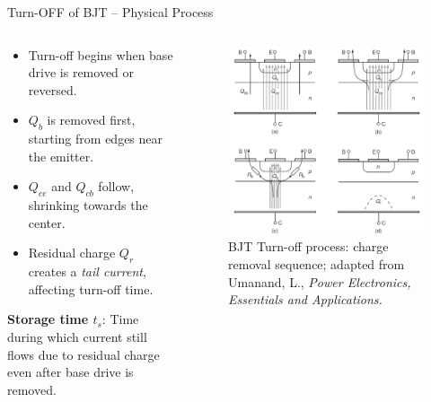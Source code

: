 \begin{frame}{Turn-OFF of BJT – Physical Process}
  \begin{columns}
    \begin{column}{0.5\textwidth}
\begin{itemize}
    \item Turn-off begins when base drive is removed or reversed.
    \item $Q_b$ is removed first, starting from edges near the emitter.
    \item $Q_{ce}$ and $Q_{cb}$ follow, shrinking towards the center.
    \item Residual charge $Q_r$ creates a \textit{tail current}, affecting turn-off time.
\end{itemize}
\textbf{Storage time $t_s$}: Time during which current still flows due to residual charge even after base drive is removed.
    \end{column}

    \begin{column}{0.5\textwidth}
\begin{figure}
    \centering
    \includegraphics[width=0.65\linewidth]{fig/lec04/BJT_turn_off.png}
    \caption{BJT Turn-off process: charge removal sequence; adapted from Umanand, L., \textit{Power Electronics, Essentials and Applications.}}
\end{figure}
    \end{column}
\end{columns}
\end{frame}



